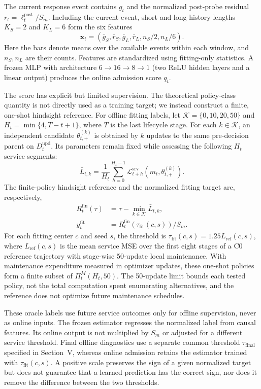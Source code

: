 \documentclass[journal]{IEEEtran}
\begin{document}
The current response event contains $g_t$ and the normalized
post-probe residual $r_t=\ell_t^{\mathrm{post}}/S_m$.
Including the current event, short and long history lengths
$K_S=2$ and $K_L=6$ form the six features
\begin{equation}
\boldsymbol x_t=(\bar g_S,\bar r_S,\bar g_L,\bar r_L,
n_S/2,n_L/6).
\end{equation}
Here the bars denote means over the available events within
each window, and $n_S,n_L$ are their counts. Features are
standardized using fitting-only statistics. A frozen MLP with
architecture $6\!\rightarrow\!16\!\rightarrow\!8\!\rightarrow\!1$
(two ReLU hidden layers and a linear output) produces the online
admission score $q_t$.

The score has explicit but limited supervision. The theoretical
policy-class quantity is not directly used as a training target;
we instead construct a finite, one-shot hindsight reference.
For offline fitting labels, let $\mathcal K=\{0,10,20,50\}$ and
$H_t=\min\{4,T-t+1\}$, where $T$ is the last lifecycle stage.
For each $k\in\mathcal K$, an independent candidate
$\theta_{t,+}^{(k)}$ is obtained by $k$ updates to the same
pre-decision parent on $D_t^{\mathrm{upd}}$. Its parameters
remain fixed while assessing the following $H_t$ service segments:
\begin{equation}
\bar L_{t,k}=\frac1{H_t}\sum_{h=0}^{H_t-1}
\mathcal L_{t+h}^{\mathrm{srv}}(m_t,\theta_{t,+}^{(k)}).
\end{equation}
The finite-policy hindsight reference and the normalized fitting
target are, respectively,
\begin{align}
R_t^{\mathrm{fin}}(\tau)
&=\tau-\min_{k\in\mathcal K}\bar L_{t,k},\\
y_t^{\mathrm{fit}}&=R_t^{\mathrm{fin}}
(\tau_{\mathrm{fit}}(c,s))/S_m.
\end{align}
For each fitting center $c$ and seed $s$, the threshold is
$\tau_{\mathrm{fit}}(c,s)=1.25L_{\mathrm{ref}}(c,s)$,
where $L_{\mathrm{ref}}(c,s)$ is the mean service MSE over the
first eight stages of a C0 reference trajectory with
stage-wise 50-update local maintenance. With maintenance
expenditure measured in optimizer updates, these one-shot
policies form a finite subset of $\Pi_t^M(H_t,50)$.
The 50-update limit bounds each tested policy, not the total
computation spent enumerating alternatives, and the reference
does not optimize future maintenance schedules.

These oracle labels use future service outcomes only for
offline supervision, never as online inputs. The frozen
estimator regresses the normalized label from causal features.
Its online output is not multiplied by $S_m$ or adjusted for
a different service threshold. Final offline diagnostics use a
separate common threshold $\tau_{\mathrm{final}}$ specified in
Section~V, whereas online admission retains the estimator
trained with $\tau_{\mathrm{fit}}(c,s)$. A positive scale
preserves the sign
of a given normalized target but does not guarantee that a
learned prediction has the correct sign, nor does it remove
the difference between the two thresholds.
\end{document}
